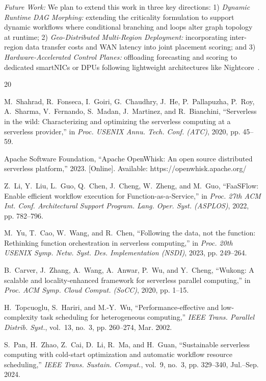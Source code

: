 \documentclass[conference]{IEEEtran}
\begin{document}
\textit{Future Work:} We plan to extend this work in three key directions: 1) \textit{Dynamic Runtime DAG Morphing:} extending the criticality formulation to support dynamic workflows where conditional branching and loops alter graph topology at runtime; 2) \textit{Geo-Distributed Multi-Region Deployment:} incorporating inter-region data transfer costs and WAN latency into joint placement scoring; and 3) \textit{Hardware-Accelerated Control Planes:} offloading forecasting and scoring to dedicated smartNICs or DPUs following lightweight architectures like Nightcore~\cite{jia2021nightcore}.

\begin{thebibliography}{20}
\setlength{\itemsep}{0pt}
\setlength{\parskip}{0pt}

M.~Shahrad, R.~Fonseca, I.~Goiri, G.~Chaudhry, J.~He, P.~Pallapuzha, P.~Roy, A.~Sharma, V.~Fernando, S.~Madan, J.~Martinez, and R.~Bianchini, ``Serverless in the wild: Characterizing and optimizing the serverless computing at a serverless provider,'' in \emph{Proc. USENIX Annu. Tech. Conf. (ATC)}, 2020, pp. 45--59.

Apache Software Foundation, ``Apache OpenWhisk: An open source distributed serverless platform,'' 2023. [Online]. Available: https://openwhisk.apache.org/

Z.~Li, Y.~Liu, L.~Guo, Q.~Chen, J.~Cheng, W.~Zheng, and M.~Guo, ``FaaSFlow: Enable efficient workflow execution for Function-as-a-Service,'' in \emph{Proc. 27th ACM Int. Conf. Architectural Support Program. Lang. Oper. Syst. (ASPLOS)}, 2022, pp. 782--796.

M.~Yu, T.~Cao, W.~Wang, and R.~Chen, ``Following the data, not the function: Rethinking function orchestration in serverless computing,'' in \emph{Proc. 20th USENIX Symp. Netw. Syst. Des. Implementation (NSDI)}, 2023, pp. 249--264.

B.~Carver, J.~Zhang, A.~Wang, A.~Anwar, P.~Wu, and Y.~Cheng, ``Wukong: A scalable and locality-enhanced framework for serverless parallel computing,'' in \emph{Proc. ACM Symp. Cloud Comput. (SoCC)}, 2020, pp. 1--15.

H.~Topcuoglu, S.~Hariri, and M.-Y.~Wu, ``Performance-effective and low-complexity task scheduling for heterogeneous computing,'' \emph{IEEE Trans. Parallel Distrib. Syst.}, vol.~13, no.~3, pp. 260--274, Mar. 2002.

S.~Pan, H.~Zhao, Z.~Cai, D.~Li, R.~Ma, and H.~Guan, ``Sustainable serverless computing with cold-start optimization and automatic workflow resource scheduling,'' \emph{IEEE Trans. Sustain. Comput.}, vol.~9, no.~3, pp. 329--340, Jul.--Sep. 2024.


\end{thebibliography}
\end{document}
